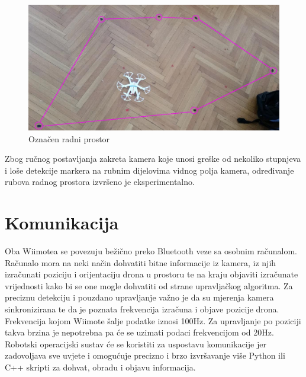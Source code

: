 \documentclass[times, utf8, diplomski]{fer}
\begin{document}
\begin{figure}[h]
\centering
\includegraphics[width=.7\textwidth]{radni_prostor}
\caption{Označen radni prostor}
\label{fig:radni}
\end{figure} 

Zbog ručnog postavljanja zakreta kamera koje unosi greške od nekoliko stupnjeva i loše detekcije markera na rubnim dijelovima vidnog polja kamera, određivanje rubova radnog prostora izvršeno je eksperimentalno.


\chapter{Komunikacija}
Oba Wiimotea se povezuju bežično preko Bluetooth veze sa osobnim računalom. Računalo mora na neki način dohvatiti bitne informacije iz kamera, iz njih izračunati poziciju i orijentaciju drona u prostoru te na kraju objaviti izračunate vrijednosti kako bi se one mogle dohvatiti od strane upravljačkog algoritma. Za preciznu detekciju i pouzdano upravljanje važno je da su mjerenja kamera sinkronizirana te da je poznata frekvencija izračuna i objave pozicije drona. Frekvencija kojom Wiimote šalje podatke iznosi 100Hz. Za upravljanje po poziciji takva brzina je nepotrebna pa će se uzimati podaci frekvencijom od 20Hz. Robotski operacijski sustav će se koristiti za uspostavu komunikacije jer zadovoljava sve uvjete i omogućuje precizno i brzo izvršavanje više Python ili C++ skripti za dohvat, obradu i objavu informacija.
 
\end{document}
